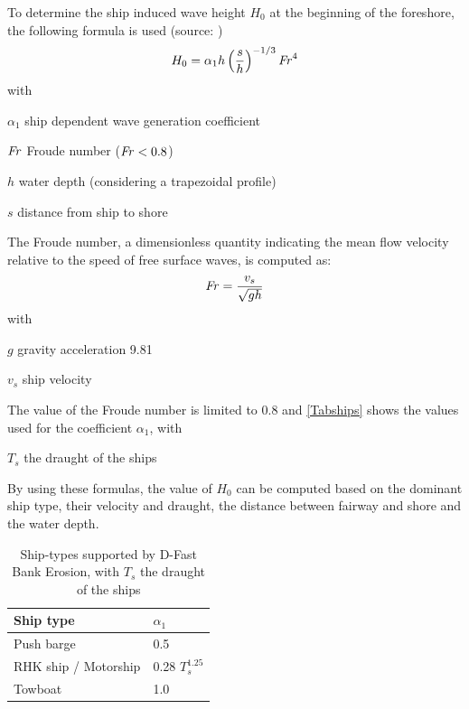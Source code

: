To determine the ship induced wave height $H_0$  at the beginning of the foreshore, the following formula is used (source: \cite{rockmanual})
%
\begin{equation}
H_0 = \alpha_1 h \left ( \frac{s}{h} \right )^{-1/3} \operatorname{\mathit{F\kern-.17em r}}^4
\end{equation}
%
with
%
\begin{symbollist}
\item[$\alpha_1$] ship dependent wave generation coefficient \unitbrackets{-}
\item[$\operatorname{\mathit{F\kern-.17em r}}$] Froude number ($\operatorname{\mathit{F\kern-.17em r}} < \text{0.8}$) \unitbrackets{-}
\item[$h$] water depth (considering a  trapezoidal profile) 
\item[$s$] distance from ship to shore 
\end{symbollist}
%
The Froude number, a dimensionless quantity indicating the mean flow velocity relative to the speed of free surface waves, is computed as:
%
\begin{equation}
\operatorname{\mathit{F\kern-.17em r}} = \frac{v_s}{\sqrt{g h}}
\end{equation}
%
with
%
\begin{symbollist}
\item[$g$] gravity acceleration 9.81 
\item[$v_s$] ship velocity 
\end{symbollist}

The value of the Froude number is limited to 0.8 and \autoref{Tabships} shows the values used for the coefficient $\alpha_1$, with
\begin{symbollist}
	\item[$T_s$]  the draught of the ships 
\end{symbollist}


By using these formulas, the value of $H_0$ can be computed based on the dominant ship type, their velocity and draught, the distance between fairway and shore and the water depth.

\begin{table}[!h]
	\begin{tabular}{ll}
		Ship type & $\alpha_1$ \\ \hline
		Push barge & 0.5 \\
		RHK ship / Motorship & 0.28 $T_s^\text{1.25}$ \\
		Towboat & 1.0 \\ \hline
	\end{tabular}
	\caption{Ship-types supported by D-Fast Bank Erosion, with $T_s$  the draught of the ships}
	\label{Tabships}
\end{table}

